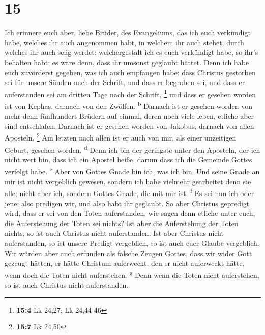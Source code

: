 \hypertarget{section-14}{%
\section{15}\label{section-14}}

 Ich erinnere euch aber, liebe Brüder, des Evangeliums,
das ich euch verkündigt habe, welches ihr auch angenommen habt, in
welchem ihr auch stehet,  durch welches ihr auch selig
werdet: welchergestalt ich es euch verkündigt habe, so ihr's behalten
habt; es wäre denn, dass ihr umsonst geglaubt hättet. 
Denn ich habe euch zuvörderst gegeben, was ich auch empfangen habe: dass
Christus gestorben sei für unsere Sünden nach der Schrift,
 und dass er begraben sei, und dass er auferstanden sei am
dritten Tage nach der Schrift, \footnote{\textbf{15:4} Lk 24,27; Lk
  24,44-46}  und dass er gesehen worden ist von Kephas,
darnach von den Zwölfen. \textsuperscript{b}  Darnach ist
er gesehen worden von mehr denn fünfhundert Brüdern auf einmal, deren
noch viele leben, etliche aber sind entschlafen.  Darnach
ist er gesehen worden von Jakobus, darnach von allen Aposteln.
\footnote{\textbf{15:7} Lk 24,50}  Am letzten nach allen
ist er auch von mir, als einer unzeitigen Geburt, gesehen worden.
\textsuperscript{d}  Denn ich bin der geringste unter den
Aposteln, der ich nicht wert bin, dass ich ein Apostel heiße, darum dass
ich die Gemeinde Gottes verfolgt habe. \textsuperscript{e}
 Aber von Gottes Gnade bin ich, was ich bin. Und seine
Gnade an mir ist nicht vergeblich gewesen, sondern ich habe vielmehr
gearbeitet denn sie alle; nicht aber ich, sondern Gottes Gnade, die mit
mir ist. \textsuperscript{f}  Es sei nun ich oder jene:
also predigen wir, und also habt ihr geglaubt.  So aber
Christus gepredigt wird, dass er sei von den Toten auferstanden, wie
sagen denn etliche unter euch, die Auferstehung der Toten sei nichts?
 Ist aber die Auferstehung der Toten nichts, so ist auch
Christus nicht auferstanden.  Ist aber Christus nicht
auferstanden, so ist unsere Predigt vergeblich, so ist auch euer Glaube
vergeblich.  Wir würden aber auch erfunden als falsche
Zeugen Gottes, dass wir wider Gott gezeugt hätten, er hätte Christum
auferweckt, den er nicht auferweckt hätte, wenn doch die Toten nicht
auferstehen. \textsuperscript{g}  Denn wenn die Toten
nicht auferstehen, so ist auch Christus nicht auferstanden.

